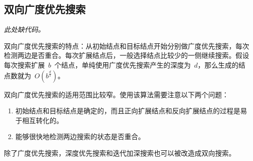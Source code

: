 \subsection{双向广度优先搜索}
	\emph{此处缺代码。}

	双向广度优先搜索的特点：从初始结点和目标结点开始分别做广度优先搜索，每次检测两边是否重合。每次扩展结点后，一般选择结点比较少的一侧继续搜索。假设每次搜索扩展~$b$~个结点，单纯使用广度优先搜索产生的深度为~$d$，那么生成的结点数就为~$O(b^\frac{d}{2})$。
	
	双向广度优先搜索的适用范围比较窄。使用该算法需要注意以下两个问题：
	
	\begin{enumerate}
		\item 初始结点和目标结点是确定的，而且正向扩展结点和反向扩展结点的过程是易于相互转化的。
		\item 能够很快地检测两边搜索的状态是否重合。
	\end{enumerate}
	
	除了广度优先搜索，深度优先搜索和迭代加深搜索也可以被改造成双向搜索。